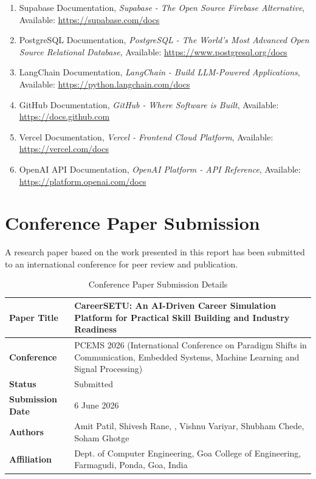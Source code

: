 \documentclass[12pt,a4paper]{report}
\begin{document}
\begin{enumerate}
    \item Supabase Documentation, \textit{Supabase - The Open Source Firebase Alternative}, Available: \url{https://supabase.com/docs}
    \item PostgreSQL Documentation, \textit{PostgreSQL - The World's Most Advanced Open Source Relational Database}, Available: \url{https://www.postgresql.org/docs}
    \item LangChain Documentation, \textit{LangChain - Build LLM-Powered Applications}, Available: \url{https://python.langchain.com/docs}
    \item GitHub Documentation, \textit{GitHub - Where Software is Built}, Available: \url{https://docs.github.com}
    \item Vercel Documentation, \textit{Vercel - Frontend Cloud Platform}, Available: \url{https://vercel.com/docs}
    \item OpenAI API Documentation, \textit{OpenAI Platform - API Reference}, Available: \url{https://platform.openai.com/docs}
\end{enumerate}


\appendix

\chapter{Conference Paper Submission}

A research paper based on the work presented in this report has been submitted to an international conference for peer review and publication.

\begin{table}[H]
\centering
\begin{tabular}{|p{4.5cm}|p{10cm}|}
\hline
\textbf{Paper Title} & CareerSETU: An AI-Driven Career Simulation Platform for Practical Skill Building and Industry Readiness \\
\hline
\textbf{Conference} & PCEMS 2026 (International Conference on Paradigm Shifts in Communication, Embedded Systems, Machine Learning and Signal Processing) \\
\hline
\textbf{Status} & Submitted \\
\hline
\textbf{Submission Date} & 6 June 2026 \\
\hline
\textbf{Authors} & Amit Patil, Shivesh Rane, , Vishnu Variyar, Shubham Chede, Soham Ghotge \\
\hline
\textbf{Affiliation} & Dept. of Computer Engineering, Goa College of Engineering, Farmagudi, Ponda, Goa, India \\
\hline
\end{tabular}
\caption{Conference Paper Submission Details}
\label{tab:conference_submission}
\end{table}
\end{document}
